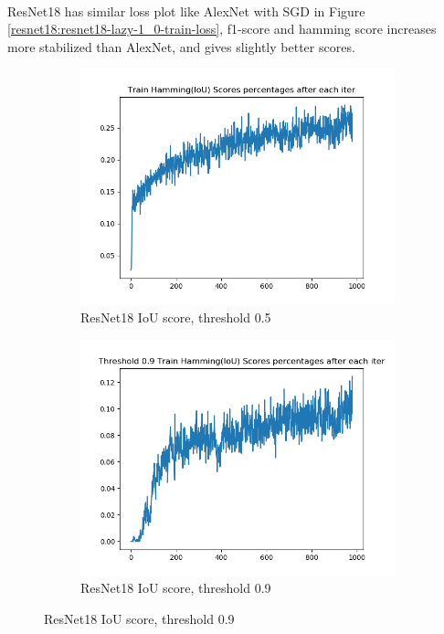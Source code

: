 \paragraph{}ResNet18 has similar loss plot like AlexNet with SGD in Figure \ref{resnet18:resnet18-lazy-1_0-train-loss}, f1-score and hamming score increases more stabilized than AlexNet, and gives slightly better scores. 
\begin{figure}[!ht]
\centering
\begin{subfigure}{.5\textwidth}
	\centering
	\includegraphics[width=1\linewidth]{resnet18-lazy-1_0-train-scores-hs.png}
	\caption{ \label{resnet18:resnet18-lazy-1.0-train-scores-hs-5}ResNet18 IoU score, threshold 0.5}
\end{subfigure}%
\begin{subfigure}{.5\textwidth}
	\centering
	\includegraphics[width=1\linewidth]{resnet18-lazy-1_0-train-scores-hs-9.png}
	\caption{\label{resnet18:resnet18-lazy-1.0-train-scores-hs-9}ResNet18 IoU score, threshold 0.9}
\end{subfigure}
\end{figure}

